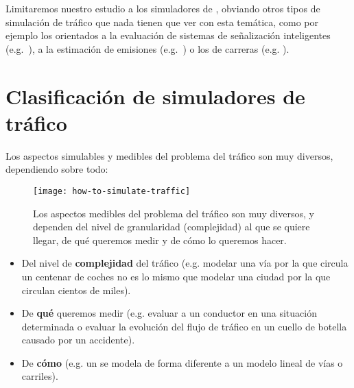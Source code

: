 
Limitaremos nuestro estudio a los simuladores de , obviando otros tipos de simulación de tráfico que nada tienen que ver con esta temática, como por ejemplo los orientados a la evaluación de sistemas de señalización inteligentes (e.g.~\cite{jin2016evaluation}), a la estimación de emisiones (e.g.~\cite{quaassdorff2016microscale}) o los de carreras (e.g. \cite{Wymann2013}).

\section{Clasificación de simuladores de tráfico}

Los aspectos simulables y medibles del problema del tráfico son muy diversos, dependiendo sobre todo:

\begin{figure}[t]
	\centering
	\texttt{[image: how-to-simulate-traffic]}
	\caption[Aspectos medibles del tráfico]{Los aspectos medibles del problema del tráfico son muy diversos, y dependen del nivel de granularidad (complejidad) al que se quiere llegar, de qué queremos medir y de cómo lo queremos hacer.}
	\label{fig:how-to-simulate-traffic}
\end{figure}

\begin{itemize}
	\item Del nivel de \textbf{complejidad} del tráfico (e.g. modelar una vía por la que circula un centenar de coches no es lo mismo que modelar una ciudad por la que circulan cientos de miles).
	\item De \textbf{qué} queremos medir (e.g. evaluar a un conductor en una situación determinada o evaluar la evolución del flujo de tráfico en un cuello de botella causado por un accidente).
	\item De \textbf{cómo} (e.g. un  se modela de forma diferente a un modelo lineal de vías o carriles).
\end{itemize}

